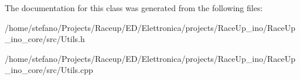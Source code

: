 The documentation for this class was generated from the following files\+:\begin{DoxyCompactItemize}
\item 
/home/stefano/\+Projects/\+Raceup/\+E\+D/\+Elettronica/projects/\+Race\+Up\+\_\+ino/\+Race\+Up\+\_\+ino\+\_\+core/src/Utils.\+h\item 
/home/stefano/\+Projects/\+Raceup/\+E\+D/\+Elettronica/projects/\+Race\+Up\+\_\+ino/\+Race\+Up\+\_\+ino\+\_\+core/src/Utils.\+cpp\end{DoxyCompactItemize}

